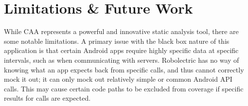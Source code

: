 \documentclass{sig-alternate}
\begin{document}
\section{Limitations \& Future Work}
\label{sec: limitations}

While CAA represents a powerful and innovative static analysis tool, there are some notable limitations. A primary issue with the black box nature of this application is that certain Android apps require highly specific data at specific intervals, such as when communicating with servers. Robolectric has no way of knowing what an app expects back from specific calls, and thus cannot correctly mock it out; it can only mock out relatively simple or common Android API calls. This may cause certain code paths to be excluded from coverage if specific results for calls are expected.





\end{document}
